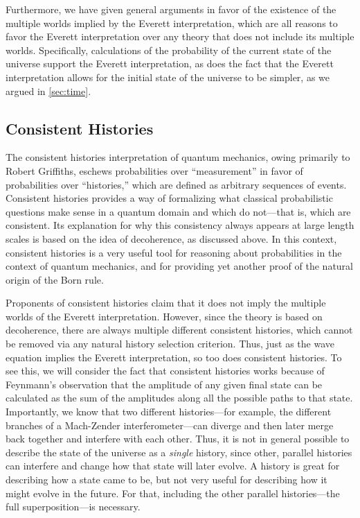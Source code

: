 \documentclass[
    12pt,
    letterpaper,
    aps,
    prd,
    longbibliography,
    twocolumn,
    nofootinbib,
    raggedbottom,
    amsmath,
    amssymb,
    amsfonts,
]{revtex4-1}
\begin{document}
Furthermore, we have given general arguments in favor of the existence of the multiple worlds implied by the Everett interpretation, which are all reasons to favor the Everett interpretation over any theory that does not include its multiple worlds. Specifically, calculations of the probability of the current state of the universe support the Everett interpretation\cite{falsification}, as does the fact that the Everett interpretation allows for the initial state of the universe to be simpler\cite{arrowoftime}, as we argued in \autoref{sec:time}.

\subsection{Consistent Histories}

The consistent histories interpretation of quantum mechanics, owing primarily to Robert Griffiths, eschews probabilities over ``measurement'' in favor of probabilities over ``histories,'' which are defined as arbitrary sequences of events.\cite{griffiths} Consistent histories provides a way of formalizing what classical probabilistic questions make sense in a quantum domain and which do not---that is, which are consistent. Its explanation for why this consistency always appears at large length scales is based on the idea of decoherence, as discussed above.\cite{griffiths}\cite{gellmann} In this context, consistent histories is a very useful tool for reasoning about probabilities in the context of quantum mechanics, and for providing yet another proof of the natural origin of the Born rule.

Proponents of consistent histories claim that it does not imply the multiple worlds of the Everett interpretation.\cite{griffiths} However, since the theory is based on decoherence, there are always multiple different consistent histories, which cannot be removed via any natural history selection criterion.\cite{setselection}\cite{gellmann} Thus, just as the wave equation implies the Everett interpretation, so too does consistent histories. To see this, we will consider the fact that consistent histories works because of Feynmann's observation that the amplitude of any given final state can be calculated as the sum of the amplitudes along all the possible paths to that state.\cite{gellmann}\cite{pathintegral} Importantly, we know that two different histories---for example, the different branches of a Mach-Zender interferometer---can diverge and then later merge back together and interfere with each other. Thus, it is not in general possible to describe the state of the universe as a \textit{single} history, since other, parallel histories can interfere and change how that state will later evolve. A history is great for describing how a state came to be, but not very useful for describing how it might evolve in the future. For that, including the other parallel histories---the full superposition---is necessary.
\end{document}
